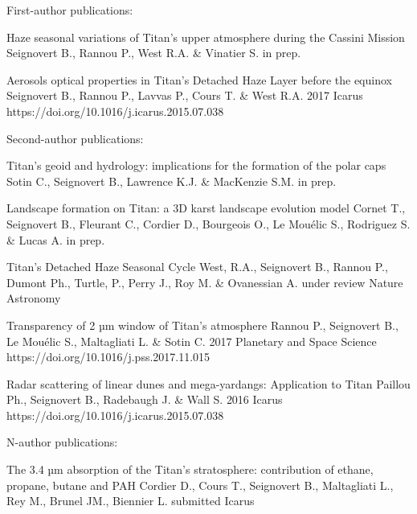 
\begin{cvpublications}{First-author publications:}

		{Haze seasonal variations of Titan's upper atmosphere during the Cassini Mission}
		{Seignovert B., Rannou P., West R.A. \& Vinatier S.}
		{in prep.}
		{}{}

		{Aerosols optical properties in Titan's Detached Haze Layer before the equinox}
		{Seignovert B., Rannou P., Lavvas P., Cours T. \& West R.A.}
		{2017}
		{Icarus}
		{https://doi.org/10.1016/j.icarus.2015.07.038}

\end{cvpublications}

\begin{cvpublications}{Second-author publications:}

		{Titan’s geoid and hydrology: implications for the formation of the polar caps}
		{Sotin C., Seignovert B., Lawrence K.J. \& MacKenzie S.M.}
		{in prep.}
		{}{}

		{Landscape formation on Titan: a 3D karst landscape evolution model}
		{Cornet T., Seignovert B., Fleurant C., Cordier D., Bourgeois O., Le Mouélic S., Rodriguez S. \& Lucas A.}
		{in prep.}
		{}{}

		{Titan's Detached Haze Seasonal Cycle}
		{West, R.A., Seignovert B., Rannou P., Dumont Ph., Turtle,  P., Perry J., Roy M. \& Ovanessian A.}
		{under review}
		{Nature Astronomy}{}

		{Transparency of 2 µm window of Titan’s atmosphere}
		{Rannou P., Seignovert B., Le Mouélic S., Maltagliati L. \& Sotin C.}
		{2017}
		{Planetary and Space Science}
		{https://doi.org/10.1016/j.pss.2017.11.015}

		{Radar scattering of linear dunes and mega-yardangs: Application to Titan}
		{Paillou Ph., Seignovert B., Radebaugh J. \& Wall S.}
		{2016}
		{Icarus}
		{https://doi.org/10.1016/j.icarus.2015.07.038}

\end{cvpublications}

\begin{cvpublications}{N-author publications:}

	{The 3.4 µm absorption of the Titan's stratosphere: contribution of ethane, propane, butane and PAH }
	{Cordier D., Cours T., Seignovert B., Maltagliati L., Rey M., Brunel JM., Biennier L.}
	{submitted}
	{Icarus}{}


\end{cvpublications}
